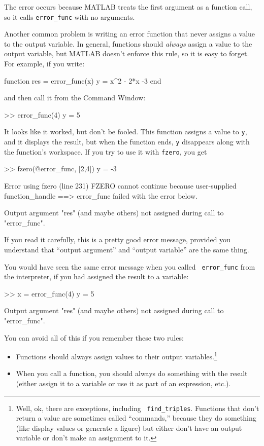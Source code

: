 \documentclass[
]{book}
\numberwithin{Answer}{chapter}
\numberwithin{Exercise}{chapter}
\begin{document}
The error occurs because MATLAB treats the first argument as a function call,
so it calls {\tt error\_func} with no arguments.

Another common problem is writing an error function that never
assigns a value to the output variable.  In general, functions should
{\em always} assign a value to the output variable, but MATLAB doesn't
enforce this rule, so it is easy to forget.  For example, if you
write:

\begin{code}
function res = error_func(x)
    y = x^2 - 2*x -3
end
\end{code}

and then call it from the {\sf Command Window}:

\begin{code}
>> error_func(4)
y = 5
\end{code}

It looks like it worked, but don't be fooled.  This function assigns
a value to {\tt y}, and it displays the result, but when the function
ends, {\tt y} disappears along with the function's workspace.
If you try to use it with {\tt fzero}, you get

\begin{code}
>> fzero(@error_func, [2,4])
y = -3

Error using fzero (line 231)
FZERO cannot continue because user-supplied function_handle ==>
error_func failed with the error below.

Output argument "res" (and maybe others) not assigned during call
to "error_func".
\end{code}

If you read it carefully, this is a pretty good error message,
provided you understand that ``output argument'' and ``output variable'' are the same thing.

You would have seen the same error message when you called {\tt
error\_func} from the interpreter, if you had assigned the result
to a variable:

\begin{code}
>> x = error_func(4)
y = 5

Output argument "res" (and maybe others) not assigned during
call to "error_func".
\end{code}

You can avoid all of this if you remember these two rules:

\begin{itemize}

\item Functions should always assign values to their output
variables.\footnote{Well, ok, there are exceptions, including {\tt
find\_triples}. Functions that don't return a value are sometimes
called ``commands,'' because they do something (like display
values or generate a figure) but either don't have an output
variable or don't make an assignment to it.}

\item When you call a function, you should always do something with
the result (either assign it to a variable or use it as part of an
expression, etc.).

\end{itemize}
\end{document}
